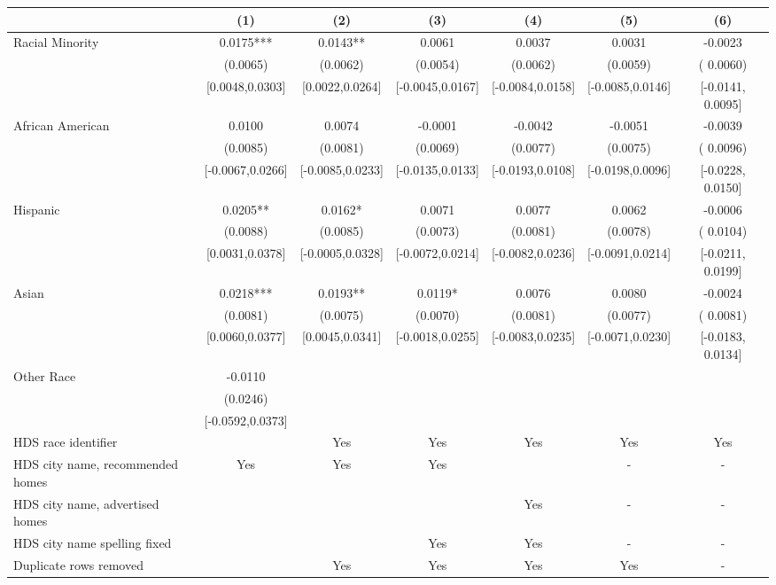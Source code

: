 \begin{table}[htbp]
{\begin{tabular}{l*{6}{c}}
                    \cmidrule(lr){2-2}\cmidrule(lr){3-3}\cmidrule(lr){4-4}\cmidrule(lr){5-5}\cmidrule(lr){6-6}\cmidrule(lr){7-7}
                    &\multicolumn{1}{c}{(1)}   &\multicolumn{1}{c}{(2)}   &\multicolumn{1}{c}{(3)}   &\multicolumn{1}{c}{(4)}   &\multicolumn{1}{c}{(5)}   &\multicolumn{1}{c}{(6)}\\
\midrule
Racial Minority & 0.0175*** & 0.0143** & 0.0061 & 0.0037 & 0.0031 & -0.0023 \\
 & (0.0065) & (0.0062) & (0.0054) & (0.0062) & (0.0059) & ( 0.0060) \\
 & [0.0048,0.0303] & [0.0022,0.0264] & [-0.0045,0.0167] & [-0.0084,0.0158] & [-0.0085,0.0146] & [-0.0141,  0.0095] \\
\midrule
African American & 0.0100 & 0.0074 & -0.0001 & -0.0042 & -0.0051 & -0.0039 \\
 & (0.0085) & (0.0081) & (0.0069) & (0.0077) & (0.0075) & ( 0.0096) \\
 & [-0.0067,0.0266] & [-0.0085,0.0233] & [-0.0135,0.0133] & [-0.0193,0.0108] & [-0.0198,0.0096] & [-0.0228,  0.0150] \\
Hispanic & 0.0205** & 0.0162* & 0.0071 & 0.0077 & 0.0062 & -0.0006 \\
 & (0.0088) & (0.0085) & (0.0073) & (0.0081) & (0.0078) & ( 0.0104) \\
 & [0.0031,0.0378] & [-0.0005,0.0328] & [-0.0072,0.0214] & [-0.0082,0.0236] & [-0.0091,0.0214] & [-0.0211,  0.0199] \\
Asian & 0.0218*** & 0.0193** & 0.0119* & 0.0076 & 0.0080 & -0.0024 \\
 & (0.0081) & (0.0075) & (0.0070) & (0.0081) & (0.0077) & ( 0.0081) \\
 & [0.0060,0.0377] & [0.0045,0.0341] & [-0.0018,0.0255] & [-0.0083,0.0235] & [-0.0071,0.0230] & [-0.0183,  0.0134] \\
Other Race & -0.0110 &  &  &  &  &  \\
 & (0.0246) &  &  &  &  &  \\
 & [-0.0592,0.0373] &  &  &  &  &  \\
\midrule
HDS race identifier & & Yes & Yes & Yes & Yes & Yes \\
HDS city name, recommended homes & Yes & Yes & Yes & & - & -\\
HDS city name, advertised homes &  &  &  & Yes & - & -\\
HDS city name spelling fixed & & & Yes & Yes & - & -\\
Duplicate rows removed &  & Yes & Yes & Yes & Yes & - \\

\end{tabular}}
\end{table}
